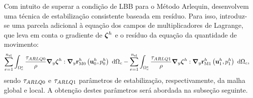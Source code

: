 Com intuito de superar a condição de LBB para o Método Arlequin,  desenvolvem uma técnica de estabilização consistente baseada em resíduo. Para isso, introduz-se uma parcela adicional à equação dos campos de multiplicadores de Lagrange, que leva em conta o gradiente de $\boldsymbol{\zeta}^h$ e o resíduo da equação da quantidade de movimento:
\begin{align}
	\sum_{e=1}^{n_{\mathrm{el}}} \int_{\Omega^e_{c}} \frac{\tau_{ARLQ0}}{\rho} \boldsymbol{\nabla}_y \boldsymbol{\zeta}^h : \boldsymbol{\nabla}_y \mathbf{r}_{\mathrm{M0}}^{h}\left(\mathbf{u}_0^h,p_0^h \right) \ \mathrm{d} \Omega_c - 
	\sum_{e=1}^{n_{\mathrm{el}}} \int_{\Omega^e_{c}} \frac{\tau_{ARLQ1}}{\rho} \boldsymbol{\nabla}_y \boldsymbol{\zeta}^h : \boldsymbol{\nabla}_y \mathbf{r}_{\mathrm{M1}}^{h}\left(\mathbf{u}_1^h,p_1^h \right) \ \mathrm{d} \Omega_c,
\end{align}
\noindent sendo $\tau_{ARLQ0}$ e $\tau_{ARLQ1}$ parâmetros de estabilização, respectivamente, da malha global e local. A obtenção destes parâmetros será abordada na subseção seguinte. 

